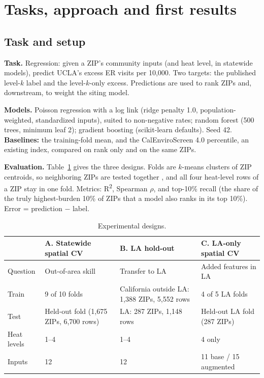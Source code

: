 \documentclass[10pt]{article}
\newcommand{\rhoS}{$\rho$}
\begin{document}
\section{Tasks, approach and first results}
\label{sec:results}

\subsection{Task and setup}
\textbf{Task.} Regression: given a ZIP's community inputs (and heat level, in statewide models), predict UCLA's excess ER visits per 10,000. Two targets: the published level-$k$ label and the level-$k$-only excess. Predictions are used to rank ZIPs and, downstream, to weight the siting model.

\textbf{Models.} Poisson regression with a log link (ridge penalty 1.0, population-weighted, standardized inputs), suited to non-negative rates; random forest (500 trees, minimum leaf 2); gradient boosting (scikit-learn defaults). Seed 42. \textbf{Baselines:} the training-fold mean, and the CalEnviroScreen 4.0 percentile, an existing index, compared on rank only and on the same ZIPs.

\textbf{Evaluation.} Table~\ref{tab:setups} gives the three designs. Folds are $k$-means clusters of ZIP centroids, so neighboring ZIPs are tested together \cite{roberts2017}, and all four heat-level rows of a ZIP stay in one fold. Metrics: R\textsuperscript{2}, Spearman \rhoS{}, and top-10\% recall (the share of the truly highest-burden 10\% of ZIPs that a model also ranks in its top 10\%). Error = prediction $-$ label.

\begin{table}[!htbp]
\centering\small
\caption{Experimental designs.}
\label{tab:setups}
\begin{tabular}{@{}p{2.3cm}p{3.4cm}p{3.4cm}p{3.4cm}@{}}
\toprule
& A. Statewide spatial CV & B. LA hold-out & C. LA-only spatial CV \\
\midrule
Question & Out-of-area skill & Transfer to LA & Added features in LA \\
Train & 9 of 10 folds & California outside LA: 1,388 ZIPs, 5,552 rows & 4 of 5 LA folds \\
Test & Held-out fold (1,675 ZIPs, 6,700 rows) & LA: 287 ZIPs, 1,148 rows & Held-out LA fold (287 ZIPs) \\
Heat levels & 1--4 & 1--4 & 4 only \\
Inputs & 12 & 12 & 11 base / 15 augmented \\
\bottomrule
\end{tabular}
\end{table}
\end{document}
